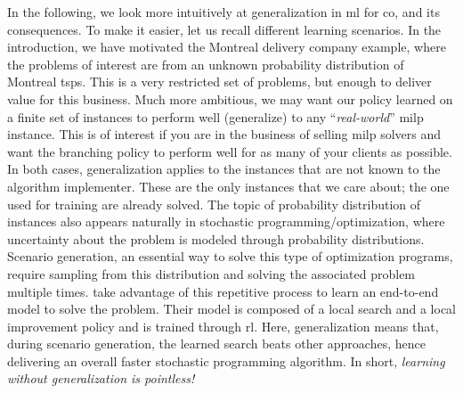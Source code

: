 \documentclass[11pt]{article}
\begin{document}
		In the following, we look more intuitively at generalization in \gls{ml} for \gls{co}, and its
		consequences.
		To make it easier, let us recall different learning scenarios.
		In the introduction, we have motivated the Montreal delivery company example, where the problems of
		interest are from an unknown probability distribution of Montreal \glspl{tsp}.
		This is a very restricted set of problems, but enough to deliver value for this business.
		Much more ambitious, we may want our policy learned on a finite set of instances to perform well
		(generalize) to any ``\textit{real-world}'' \gls{milp} instance.
		This is of interest if you are in the business of selling \gls{milp} solvers and want the branching
		policy to perform well for as many of your clients as possible.
		In both cases, generalization applies to the instances that are not known to the algorithm
		implementer.
		These are the only instances that we care about; the one used for training are already solved.
		The topic of probability distribution of instances also appears naturally in stochastic
		programming/optimization, where uncertainty about the problem is modeled through probability
		distributions.
		Scenario generation, an essential way to solve this type of optimization programs, require sampling
		from this distribution and solving the associated problem multiple times.
		\cite{NairLearning2018} take advantage of this repetitive process to learn an end-to-end
		model to solve the problem.
		Their model is composed of a local search and a local improvement policy and is trained through
		\gls{rl}.
		Here, generalization means that, during scenario generation, the learned search beats other
		approaches, hence delivering an overall faster stochastic programming algorithm.
		In short, \emph{learning without generalization is pointless!}
\end{document}
